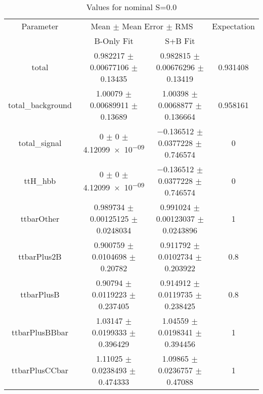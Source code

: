 \begin{table}
\centering
\caption{Values for nominal S=0.0}
\begin{tabular}{cccc}
\toprule
Parameter & \multicolumn{2}{c}{Mean $\pm$ Mean Error $\pm$ RMS} & Expectation\\
 & B-Only Fit & S+B Fit & \\
\midrule
total & \num{0.982217} $\pm$ \num{0.00677106} $\pm$ \num{0.13435} & \num{0.982815} $\pm$ \num{0.00676296} $\pm$ \num{0.13419} & \num{0.931408}\\
total\_background & \num{1.00079} $\pm$ \num{0.00689911} $\pm$ \num{0.13689} & \num{1.00398} $\pm$ \num{0.0068877} $\pm$ \num{0.136664} & \num{0.958161}\\
total\_signal & \num{0} $\pm$ \num{0} $\pm$ \num{4.12099e-09} & \num{-0.136512} $\pm$ \num{0.0377228} $\pm$ \num{0.746574} & \num{0}\\
ttH\_hbb & \num{0} $\pm$ \num{0} $\pm$ \num{4.12099e-09} & \num{-0.136512} $\pm$ \num{0.0377228} $\pm$ \num{0.746574} & \num{0}\\
ttbarOther & \num{0.989734} $\pm$ \num{0.00125125} $\pm$ \num{0.0248034} & \num{0.991024} $\pm$ \num{0.00123037} $\pm$ \num{0.0243896} & \num{1}\\
ttbarPlus2B & \num{0.900759} $\pm$ \num{0.0104698} $\pm$ \num{0.20782} & \num{0.911792} $\pm$ \num{0.0102734} $\pm$ \num{0.203922} & \num{0.8}\\
ttbarPlusB & \num{0.90794} $\pm$ \num{0.0119223} $\pm$ \num{0.237405} & \num{0.914912} $\pm$ \num{0.0119735} $\pm$ \num{0.238425} & \num{0.8}\\
ttbarPlusBBbar & \num{1.03147} $\pm$ \num{0.0199333} $\pm$ \num{0.396429} & \num{1.04559} $\pm$ \num{0.0198341} $\pm$ \num{0.394456} & \num{1}\\
ttbarPlusCCbar & \num{1.11025} $\pm$ \num{0.0238493} $\pm$ \num{0.474333} & \num{1.09865} $\pm$ \num{0.0236757} $\pm$ \num{0.47088} & \num{1}\\
\bottomrule
\end{tabular}
\end{table}